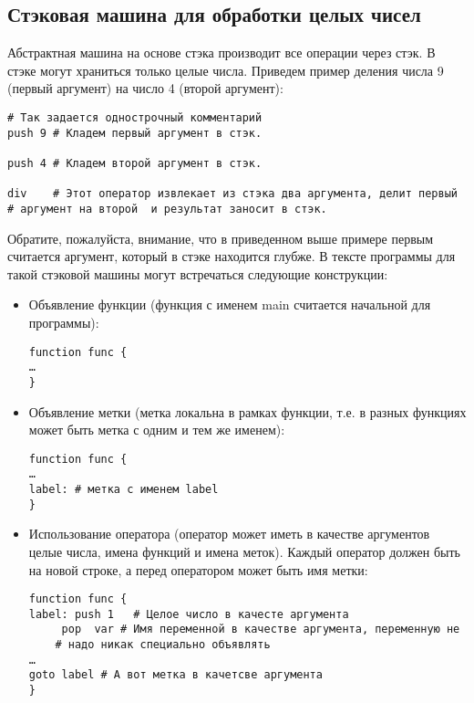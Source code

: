 \documentclass[a4paper,12pt]{article}
\begin{document}
\subsection{Стэковая машина для обработки целых чисел}

Абстрактная машина на основе стэка производит все операции через
стэк. В стэке могут храниться только целые числа. Приведем пример
деления числа 9 (первый аргумент) на число 4 (второй аргумент):

\begin{verbatim}
# Так задается однострочный комментарий
push 9 # Кладем первый аргумент в стэк.

push 4 # Кладем второй аргумент в стэк.

div    # Этот оператор извлекает из стэка два аргумента, делит первый 
# аргумент на второй  и результат заносит в стэк.
\end{verbatim}

Обратите, пожалуйста, внимание, что в приведенном выше примере первым
считается аргумент, который в стэке находится глубже. В тексте
программы для такой стэковой машины могут встречаться следующие
конструкции:

\begin{itemize}
\item Объявление функции (функция с именем main считается начальной
  для программы):
\begin{verbatim}
function func {
…
}
\end{verbatim}

\item Объявление метки (метка локальна в рамках функции, т.е. в разных
  функциях может быть метка с одним и тем же именем):
\begin{verbatim}
function func {
…
label: # метка с именем label
}
\end{verbatim}

\item Использование оператора (оператор может иметь в качестве
  аргументов целые числа, имена функций и имена меток). Каждый
  оператор должен быть на новой строке, а перед оператором может быть
  имя метки:
\begin{verbatim}
function func {
label: push 1   # Целое число в качесте аргумента
     pop  var # Имя переменной в качестве аргумента, переменную не 
    # надо никак специально объявлять
…
goto label # А вот метка в качетсве аргумента
}
\end{verbatim}
\end{itemize}
\end{document}
